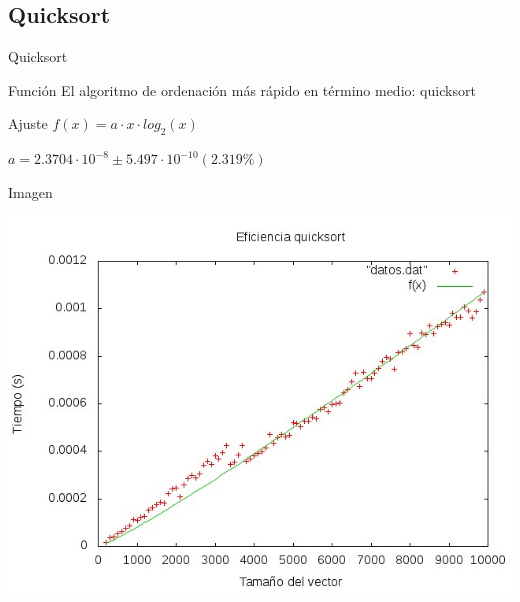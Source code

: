 \documentclass[compress]{beamer}
\begin{document}
\subsection{Quicksort}
\begin{frame}{Quicksort}
	\begin{block}{Función}
	El algoritmo de ordenación más rápido en término medio: quicksort
	\end{block}
	
	\begin{block}{Ajuste}
	$f(x) = a\cdot x\cdot log_2(x)$

	$a               = 2.3704\cdot 10^{-8}       \pm 5.497\cdot 10^{-10}    (2.319\%) $
	\end{block}
\end{frame}
\begin{frame}
	\begin{alertblock}{Imagen}
	\begin{center}
	\includegraphics[scale=0.55]{../Graficas/Quicksort/quicksortO0_bruno.jpeg}					\end{center}	
	\end{alertblock}
\end{frame}

\end{document}
